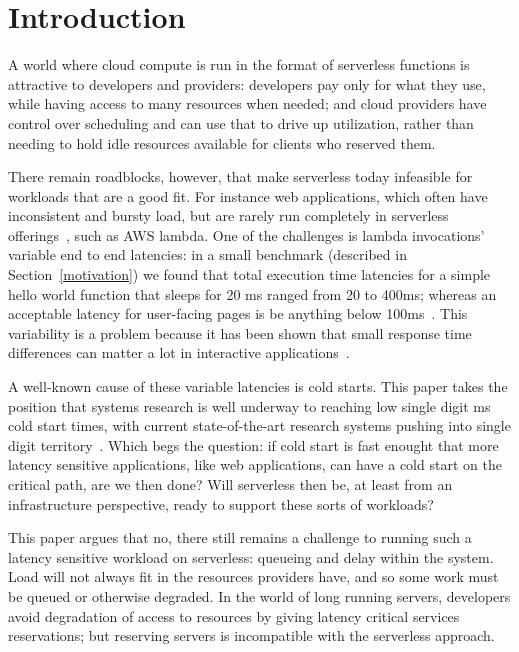 \section{Introduction}

A world where cloud compute is run in the format of serverless functions is
attractive to developers and providers: developers pay only for what they use,
while having access to many resources when needed; and cloud providers have
control over scheduling and can use that to drive up utilization, rather than
needing to hold idle resources available for clients who reserved them.


There remain roadblocks, however, that make serverless today infeasible for
workloads that are a good fit. For instance web applications, which often have
inconsistent and bursty load, but are rarely run completely in serverless
offerings~\cite{reddit-serverless1}, such as AWS lambda. One of the challenges
is lambda invocations' variable end to end latencies: in a small benchmark
(described in Section~\ref{motivation}) we found that total execution time
latencies for a simple hello world function that sleeps for 20 ms ranged from 20
to 400ms; whereas an acceptable latency for user-facing pages is be anything
below 100ms~\cite{page-load-time}. This variability is a problem because it has
been shown that small response time differences can matter a lot in interactive
applications~\cite{amz-page-load,google-page-load}.


A well-known cause of these variable latencies is cold starts. This paper takes
the position that systems research is well underway to reaching low single digit
ms cold start times, with current state-of-the-art research systems pushing into
single digit territory~\cite{sigmaos,mitosis}. Which begs the question: if cold
start is fast enought that more latency sensitive applications, like web
applications, can have a cold start on the critical path, are we then done? Will
serverless then be, at least from an infrastructure perspective, ready to
support these sorts of workloads?

This paper argues that no, there still remains a challenge to running such a
latency sensitive workload on serverless: queueing and delay within the system.
Load will not always fit in the resources providers have, and so some work must
be queued or otherwise degraded. In the world of long running servers,
developers avoid degradation of access to resources by giving latency critical
services reservations; but reserving servers is incompatible with the serverless
approach. 



